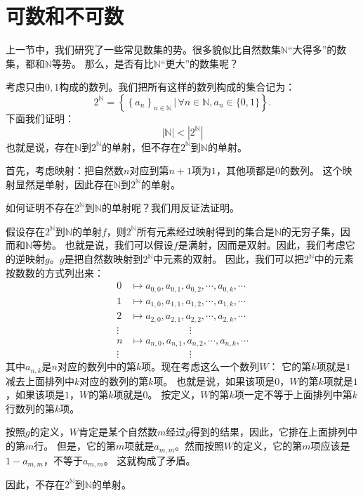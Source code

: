\documentclass[12pt,UTF8]{ctexbook}
\begin{document}
\section{可数和不可数}
上一节中，我们研究了一些常见数集的势。很多貌似比自然数集$\mathbb{N}$“大得多”的数集，都和$\mathbb{N}$等势。
那么，是否有比$\mathbb{N}$“更大”的数集呢？

考虑只由$0,1$构成的数列。我们把所有这样的数列构成的集合记为：
$$ 2^\mathbb{N} = \left\{\left\{a_n\right\}_{n\in\mathbb{N}} \, | \, \forall n\in\mathbb{N}, a_n \in \{0, 1\} \right\}. $$
下面我们证明：
$$|\mathbb{N}| < |2^\mathbb{N}|$$
也就是说，存在$\mathbb{N}$到$2^\mathbb{N}$的单射，但不存在$2^\mathbb{N}$到$\mathbb{N}$的单射。

首先，考虑映射：把自然数$n$对应到第$n+1$项为$1$，其他项都是$0$的数列。
这个映射显然是单射，因此存在$\mathbb{N}$到$2^\mathbb{N}$的单射。

如何证明不存在$2^\mathbb{N}$到$\mathbb{N}$的单射呢？我们用反证法证明。

假设存在$2^\mathbb{N}$到$\mathbb{N}$的单射$f$，则$2^\mathbb{N}$所有元素经过映射得到的集合是$\mathbb{N}$的无穷子集，因而和$\mathbb{N}$等势。
也就是说，我们可以假设$f$是满射，因而是双射。因此，我们考虑它的逆映射$g$。$g$是把自然数映射到$2^\mathbb{N}$中元素的双射。
因此，我们可以把$2^\mathbb{N}$中的元素按数数的方式列出来：
\begin{align*}
    0 &\mapsto a_{0,0}, a_{0,1}, a_{0,2}, \cdots , a_{0,k}, \cdots  \\
    1 &\mapsto a_{1,0}, a_{1,1}, a_{1,2}, \cdots , a_{1,k}, \cdots  \\
    2 &\mapsto a_{2,0}, a_{2,1}, a_{2,2}, \cdots , a_{2,k}, \cdots  \\
    \vdots & \qquad \qquad\qquad \vdots  \\
    n &\mapsto a_{n,0}, a_{n,1}, a_{n,2}, \cdots , a_{n,k}, \cdots  \\
    \vdots & \qquad \qquad\qquad \vdots  
\end{align*}
其中$a_{n,k}$是$n$对应的数列中的第$k$项。现在考虑这么一个数列$W$：
它的第$k$项就是$1$减去上面排列中$k$对应的数列的第$k$项。
也就是说，如果该项是$0$，$W$的第$k$项就是$1$，如果该项是$1$，$W$的第$k$项就是$0$。
按定义，$W$的第$k$项一定不等于上面排列中第$k$行数列的第$k$项。

按照$g$的定义，$W$肯定是某个自然数$m$经过$g$得到的结果，因此，它排在上面排列中的第$m$行。
但是，它的第$m$项就是$a_{m,m}$。然而按照$W$的定义，它的第$m$项应该是$1 - a_{m,m}$，不等于$a_{m,m}$。
这就构成了矛盾。

因此，不存在$2^\mathbb{N}$到$\mathbb{N}$的单射。
\end{document}
